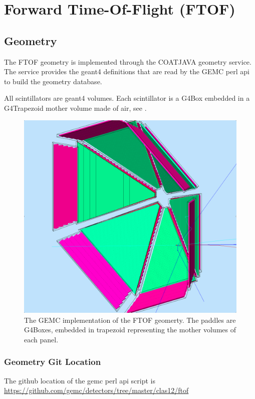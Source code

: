 \section{Forward Time-Of-Flight (FTOF)}


\subsection{Geometry}

The FTOF geometry is implemented through the COATJAVA geometry service.
The service provides the geant4 definitions that are read by the GEMC perl api to build the geometry database.

All scintillators are geant4 volumes.
Each scintillator is a G4Box embedded in a G4Trapezoid mother volume made of air, see .

\begin{figure}
	\centering
	\includegraphics[width=0.95\columnwidth,keepaspectratio]{img/ftofGeometry.png}
	\caption{The GEMC implementation of the FTOF geomerty. The paddles are G4Boxes, embedded in trapezoid representing the mother volumes of each panel.}
	\label{fig:ftofGeometry}
\end{figure}


\subsubsection{Geometry Git Location}
The github location of the gemc perl api script is \url{https://github.com/gemc/detectors/tree/master/clas12/ftof}

